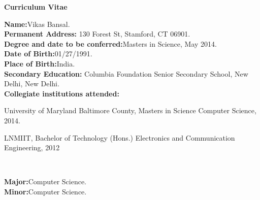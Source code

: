 \begin{titlepage}

\begin{center}
\vspace{0.1in}
\large{\bf Curriculum Vitae}
\bigskip \bigskip
\end{center}

\begin{flushleft}
  {\bf Name:}{\hspace{3mm}}Vikas Bansal.\\
	{\bf Permanent Address:}{\hspace{3mm}} 130 Forest St, Stamford, CT 06901. \\
	{\bf Degree and date to be conferred:}{\hspace{3mm}}Masters in Science, May 2014. \\
	{\bf Date of Birth:}{\hspace{3mm}}01/27/1991. \\
	{\bf Place of Birth:}{\hspace{3mm}}India. \\
	{\bf Secondary Education:}{\hspace{3mm}} Columbia Foundation Senior Secondary School, New Delhi, New Delhi.\\
	{\bf Collegiate institutions attended:}\\
	\begin{singlespace} 
	{\hspace{0.4in}}University of Maryland Baltimore County, Masters in Science Computer Science, 2014. \\
	{\hspace{0.4in}}\parbox[t]{5.5in}{LNMIIT, Bachelor of Technology (Hons.) Electronics and Communication Engineering, 2012} \\
	\end{singlespace} 
	\vspace{8pt}
	{\bf Major:}{\hspace{3mm}}Computer Science.\\
	{\bf Minor:}{\hspace{3mm}}Computer Science.\\

\end{flushleft}
\end{titlepage}
